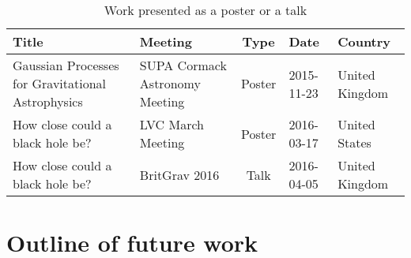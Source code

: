 \documentclass{kentigern}
\begin{document}
\begin{table}
  \centering
  \begin{tabular}[b]{llcll}
    Title & Meeting & Type & Date & Country \\ \hline
    Gaussian Processes for Gravitational Astrophysics & SUPA Cormack Astronomy Meeting & Poster & 2015-11-23 & United Kingdom \\
    How close could a black hole be? & LVC March Meeting & Poster & 2016-03-17 & United States\\
    How close could a black hole be? & BritGrav 2016 & Talk & 2016-04-05 & United Kingdom
  \end{tabular}
  \caption{Work presented as a poster or a talk}
  \label{tab:presentations}
\end{table}

\part{Outline of future work}
\label{part:future}






\end{document}
